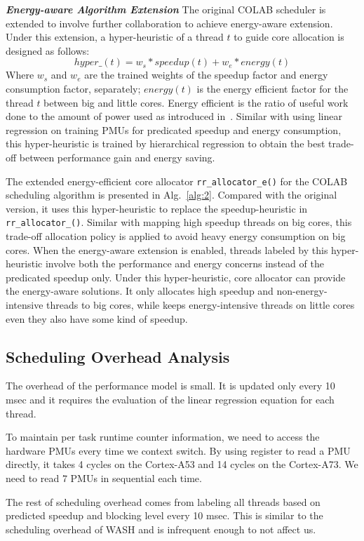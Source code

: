 \textbf{\textit{Energy-aware Algorithm Extension}}
The original COLAB scheduler is extended to involve further collaboration to achieve energy-aware extension. Under this extension, a hyper-heuristic of a thread $t$ to guide core allocation is designed as follows:
$$ hyper\_(t) = w_{s}*speedup(t) + w_{e}*energy(t) $$
Where $w_{s}$ and $w_{e}$ are the trained weights of the speedup factor and energy consumption factor, separately; $energy(t)$ is the energy efficient factor for the thread $t$ between big and little cores. Energy efficient is the ratio of useful work done to the amount of power used as introduced in~\cite{tsirogiannis2010analyzing}. Similar with using linear regression on training PMUs for predicated speedup and energy consumption, this hyper-heuristic is trained by hierarchical regression to obtain the best trade-off between performance gain and energy saving.

The extended energy-efficient core allocator \texttt{rr\_allocator\_e()} for the COLAB scheduling algorithm is presented in Alg.~\ref{alg:2}. Compared with the original version, it uses this hyper-heuristic to replace the speedup-heuristic in \texttt{rr\_allocator\_()}. Similar with mapping high speedup threads on big cores, this trade-off allocation policy is applied to avoid heavy energy consumption on big cores. When the energy-aware extension is enabled, threads labeled by this hyper-heuristic involve both the performance and energy concerns instead of the predicated speedup only. Under this hyper-heuristic, core allocator can provide the energy-aware solutions. It only allocates high speedup and non-energy-intensive threads to big cores, while keeps energy-intensive threads on little cores even they also have some kind of speedup. 

\subsection{Scheduling Overhead Analysis}
The overhead of the performance model is small. It is updated only every 10 msec and it requires the evaluation of the linear regression equation for each thread. 

To maintain per task runtime counter information, we need to access the hardware PMUs every time we context switch. By using register to read a PMU directly, it takes 4 cycles on the Cortex-A53 and 14 cycles on the Cortex-A73. We need to read 7 PMUs in sequential each time.

The rest of scheduling overhead comes from labeling all threads based on predicted speedup and blocking level every 10 msec. This is similar to the scheduling overhead of WASH and is infrequent enough to not affect us.

